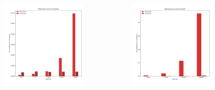 \documentclass[aspectratio=169]{beamer}
\begin{document}
\begin{frame}{}
	\begingroup
	\small
	\begin{columns}
		\begin{column}{0.50\textwidth}
			\begin{figure}
				\includegraphics[width=1\textwidth]{resources/images/bit-reverse-low.png}
			\end{figure}
		\end{column}
		\begin{column}{0.50\textwidth}
			\begin{figure}
				\includegraphics[width=1\textwidth]{resources/images/bit-reverse-high.png}

\end{figure}
\end{column}
\end{columns}
\end{frame}
\end{document}
